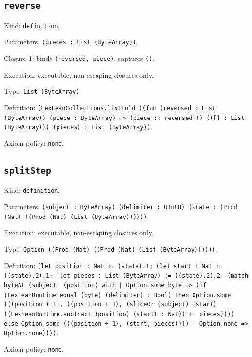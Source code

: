 \documentclass[11pt]{article}
\begin{document}
\subsection*{\texttt{reverse}}
\noindent Kind: \texttt{definition}.\par
\noindent Parameters: \texttt{(pieces : List (ByteArray))}.\par
\noindent Closure 1: binds \texttt{(reversed, piece)}, captures \texttt{()}.\par
\noindent Execution: executable, non-escaping closures only.\par
\noindent Type: \texttt{List (ByteArray)}.\par
\noindent Definition: \texttt{(LexLeanCollections.listFold ((fun (reversed : List (ByteArray)) (piece : ByteArray) => (piece :: reversed))) (([] : List (ByteArray))) (pieces) : List (ByteArray))}.\par
\noindent Axiom policy: \texttt{none}.\par
\subsection*{\texttt{splitStep}}
\noindent Kind: \texttt{definition}.\par
\noindent Parameters: \texttt{(subject : ByteArray) (delimiter : UInt8) (state : (Prod (Nat) ((Prod (Nat) (List (ByteArray))))))}.\par
\noindent Execution: executable, non-escaping closures only.\par
\noindent Type: \texttt{Option ((Prod (Nat) ((Prod (Nat) (List (ByteArray))))))}.\par
\noindent Definition: \texttt{(let position : Nat := (state).1; (let start : Nat := ((state).2).1; (let pieces : List (ByteArray) := ((state).2).2; (match byteAt (subject) (position) with | Option.some byte => (if (LexLeanRuntime.equal (byte) (delimiter) : Bool) then Option.some (((position + 1), ((position + 1), (sliceOr (subject) (start) ((LexLeanRuntime.subtract (position) (start) : Nat)) :: pieces)))) else Option.some (((position + 1), (start, pieces)))) | Option.none => Option.none))))}.\par
\noindent Axiom policy: \texttt{none}.\par
\end{document}

